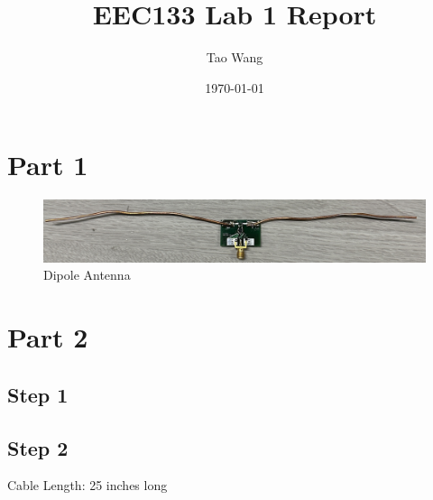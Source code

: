 \documentclass{article} %
\begin{document}
\title{EEC133 Lab 1 Report}
\author{Tao Wang}
\date{\today}

\maketitle
\tableofcontents

\section*{Part 1}
\begin{figure}[H]
    \centering
    \includegraphics[width=1\textwidth]{./image/figure1.jpeg}
    \caption{Dipole Antenna}
\end{figure}

\section*{Part 2}

\subsection*{Step 1}


\subsection*{Step 2}

Cable Length: 25 inches long
\end{document}
